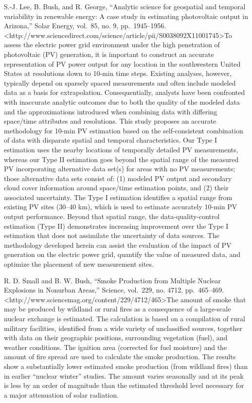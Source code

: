 \documentclass[]{article}
\begin{document}
S.-J. Lee, B. Bush, and R. George, ``Analytic science for geospatial and
temporal variability in renewable energy: A case study in estimating
photovoltaic output in Arizona,'' Solar Energy, vol.~85, no. 9,
pp.~1945--1956.
\textless{}http://www.sciencedirect.com/science/article/pii/S0038092X11001745\textgreater{}To
assess the electric power grid environment under the high penetration of
photovoltaic (PV) generation, it is important to construct an accurate
representation of PV power output for any location in the southwestern
United States at resolutions down to 10-min time steps. Existing
analyses, however, typically depend on sparsely spaced measurements and
often include modeled data as a basis for extrapolation.
Consequentially, analysts have been confronted with inaccurate analytic
outcomes due to both the quality of the modeled data and the
approximations introduced when combining data with differing space/time
attributes and resolutions. This study proposes an accurate methodology
for 10-min PV estimation based on the self-consistent combination of
data with disparate spatial and temporal characteristics. Our Type I
estimation uses the nearby locations of temporally detailed PV
measurements, whereas our Type II estimation goes beyond the spatial
range of the measured PV incorporating alternative data set(s) for areas
with no PV measurements; those alternative data sets consist of: (1)
modeled PV output and secondary cloud cover information around
space/time estimation points, and (2) their associated uncertainty. The
Type I estimation identifies a spatial range from existing PV sites
(30--40 km), which is used to estimate accurately 10-min PV output
performance. Beyond that spatial range, the data-quality-control
estimation (Type II) demonstrates increasing improvement over the Type I
estimation that does not assimilate the uncertainty of data sources. The
methodology developed herein can assist the evaluation of the impact of
PV generation on the electric power grid, quantify the value of measured
data, and optimize the placement of new measurement sites.

R. D. Small and B. W. Bush, ``Smoke Production from Multiple Nuclear
Explosions in Nonurban Areas,'' Science, vol.~229, no. 4712,
pp.~465--469.
\textless{}http://www.sciencemag.org/content/229/4712/465\textgreater{}The
amount of smoke that may be produced by wildland or rural fires as a
consequence of a large-scale nuclear exchange is estimated. The
calculation is based on a compilation of rural military facilities,
identified from a wide variety of unclassified sources, together with
data on their geographic positions, surrounding vegetation (fuel), and
weather conditions. The ignition area (corrected for fuel moisture) and
the amount of fire spread are used to calculate the smoke production.
The results show a substantially lower estimated smoke production (from
wildland fires) than in earlier ``nuclear winter'' studies. The amount
varies seasonally and at its peak is less by an order of magnitude than
the estimated threshold level necessary for a major attenuation of solar
radiation.
\end{document}
